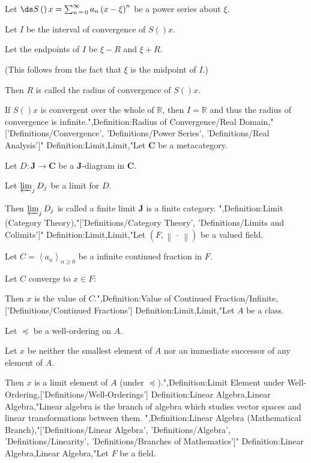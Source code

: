 Let $\ds S \left(   \right)x = \sum_{n \mathop = 0}^\infty a_n \left( x - \xi \right)^n$ be a power series about $\xi$.

Let $I$ be the interval of convergence of $S \left(   \right)x$.

Let the endpoints of $I$ be $\xi - R$ and $\xi + R$.

(This follows from the fact that $\xi$ is the midpoint of $I$.)


Then $R$ is called the radius of convergence of $S \left(   \right)x$.


If $S \left(   \right)x$ is convergent over the whole of $\mathbb R$, then $I = \mathbb R$ and thus the radius of convergence is infinite.",Definition:Radius of Convergence/Real Domain,"['Definitions/Convergence', 'Definitions/Power Series', 'Definitions/Real Analysis']"
Definition:Limit,Limit,"Let $\mathbf C$ be a metacategory.

Let $D: \mathbf J \to \mathbf C$ be a $\mathbf J$-diagram in $\mathbf C$.

Let $\varprojlim_j D_j$ be a limit for $D$.


Then $\varprojlim_j D_j$ is called a finite limit  $\mathbf J$ is a finite category.
",Definition:Limit (Category Theory),"['Definitions/Category Theory', 'Definitions/Limits and Colimits']"
Definition:Limit,Limit,"Let $\left( F, \left\lVert \,\cdot\, \right\rVert  \right)$ be a valued field.

Let $C = \left\langle a_n \right\rangle_{n \mathop \ge 0}$ be a infinite continued fraction in $F$.


Let $C$ converge to $x \in F$:

Then $x$ is the value of $C$.",Definition:Value of Continued Fraction/Infinite,['Definitions/Continued Fractions']
Definition:Limit,Limit,"Let $A$ be a class.

Let $\preccurlyeq$ be a well-ordering on $A$.

Let $x$ be neither the smallest element of $A$ nor an immediate successor of any element of $A$.


Then $x$ is a limit element of $A$ (under $\preccurlyeq$).",Definition:Limit Element under Well-Ordering,['Definitions/Well-Orderings']
Definition:Linear Algebra,Linear Algebra,"Linear algebra is the branch of algebra which studies vector spaces and linear transformations between them.
",Definition:Linear Algebra (Mathematical Branch),"['Definitions/Linear Algebra', 'Definitions/Algebra', 'Definitions/Linearity', 'Definitions/Branches of Mathematics']"
Definition:Linear Algebra,Linear Algebra,"Let $F$ be a field.


